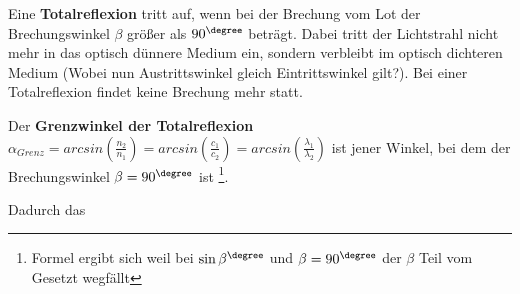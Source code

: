\documentclass[../document.tex]{subfiles}
\begin{document}
Eine \textbf{Totalreflexion} tritt auf, wenn bei der Brechung vom Lot der Brechungswinkel $\beta$ größer als $90^\degree$ beträgt. Dabei tritt der Lichtstrahl nicht mehr in das optisch dünnere Medium ein, sondern verbleibt im optisch dichteren Medium (Wobei nun Austrittswinkel gleich Eintrittswinkel gilt?). Bei einer Totalreflexion findet keine Brechung mehr statt.

Der \textbf{Grenzwinkel der Totalreflexion } $\alpha_{Grenz} = arcsin(\frac{n_2}{n_1}) = arcsin(\frac{c_1}{c_2}) = arcsin(\frac{\lambda_1}{\lambda_2})$ ist jener Winkel, bei dem der Brechungswinkel $\beta = 90^\degree$ ist \footnote{Formel ergibt sich weil bei $\sin\beta^\degree$ und $\beta = 90^\degree$ der $\beta$ Teil vom Gesetzt wegfällt}. 

Dadurch das 
\end{document}
